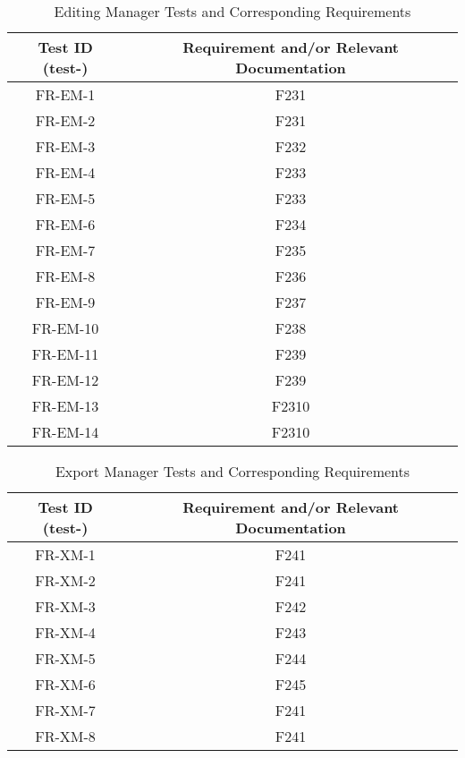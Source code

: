 \documentclass[12pt, titlepage]{article}
\begin{document}
\begin{table}[h!]
  \centering
  \caption{Editing Manager Tests and Corresponding Requirements}
  \begin{tabular}{c c}
    \hline
    \textbf{Test ID (test-)} & \textbf{Requirement and/or Relevant Documentation} \\ \hline
    FR-EM-1 & F231\\
    FR-EM-2 & F231\\
    FR-EM-3 & F232\\
    FR-EM-4 & F233\\
    FR-EM-5 & F233\\
    FR-EM-6 & F234\\
    FR-EM-7 & F235\\
    FR-EM-8 & F236\\
    FR-EM-9 & F237\\
    FR-EM-10 & F238\\
    FR-EM-11 & F239\\
    FR-EM-12 & F239\\
    FR-EM-13 & F2310\\
    FR-EM-14 & F2310\\
  \end{tabular}
\end{table}

\begin{table}[h!]
  \centering
  \caption{Export Manager Tests and Corresponding Requirements}
  \begin{tabular}{c c}
    \hline
    \textbf{Test ID (test-)} & \textbf{Requirement and/or Relevant Documentation} \\ \hline
    FR-XM-1 & F241\\
    FR-XM-2 & F241\\
    FR-XM-3 & F242\\
    FR-XM-4 & F243\\
    FR-XM-5 & F244\\
    FR-XM-6 & F245\\
    FR-XM-7 & F241\\
    FR-XM-8 & F241\\
  \end{tabular}
\end{table}
\end{document}
